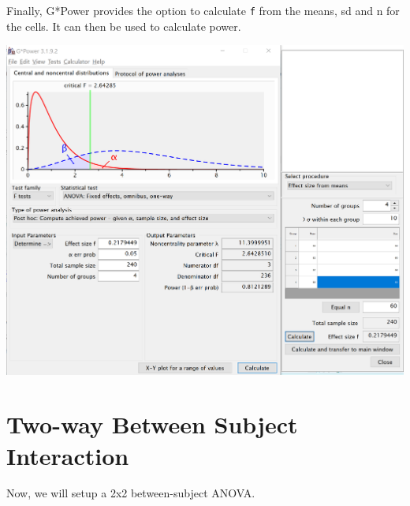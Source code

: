 \documentclass[
]{book}
\begin{document}
Finally, G*Power \citep{faul2007g} provides the option to calculate \texttt{f} from the means, sd and n for the cells. It can then be used to calculate power.

\includegraphics{screenshots/gpower_13.png}

\hypertarget{two-way-between-subject-interaction}{%
\section{Two-way Between Subject Interaction}\label{two-way-between-subject-interaction}}

Now, we will setup a 2x2 between-subject ANOVA.
\end{document}
